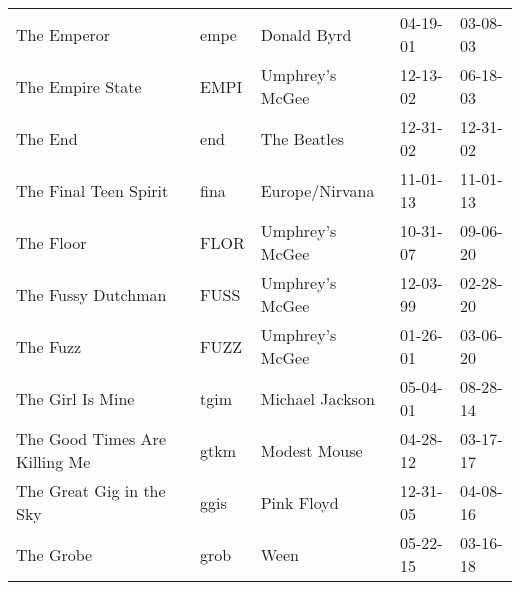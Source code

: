 \begin{longtable}{p{}p{}p{}p{}p{}}
                                                             The Emperor &          empe &                                              Donald Byrd &              04-19-01 &             03-08-03 \\
                                                        The Empire State &          EMPI &                                          Umphrey's McGee &              12-13-02 &             06-18-03 \\
                                                                 The End &           end &                                              The Beatles &              12-31-02 &             12-31-02 \\
                                                   The Final Teen Spirit &          fina &                                           Europe/Nirvana &              11-01-13 &             11-01-13 \\
                                                               The Floor &          FLOR &                                          Umphrey's McGee &              10-31-07 &             09-06-20 \\
                                                      The Fussy Dutchman &          FUSS &                                          Umphrey's McGee &              12-03-99 &             02-28-20 \\
                                                                The Fuzz &          FUZZ &                                          Umphrey's McGee &              01-26-01 &             03-06-20 \\
                                                        The Girl Is Mine &          tgim &                                          Michael Jackson &              05-04-01 &             08-28-14 \\
                                           The Good Times Are Killing Me &          gtkm &                                             Modest Mouse &              04-28-12 &             03-17-17 \\
                                                The Great Gig in the Sky &          ggis &                                               Pink Floyd &              12-31-05 &             04-08-16 \\
                                                               The Grobe &          grob &                                                     Ween &              05-22-15 &             03-16-18 \\

\end{longtable}
